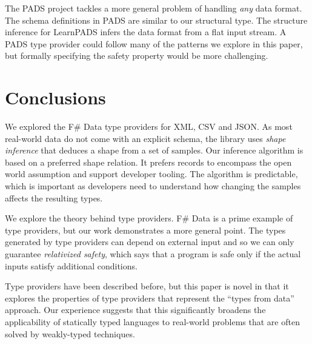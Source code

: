 \documentclass[10pt,preprint,blind,clearpagebib]{sigplanconf}
\begin{document}
The PADS project \cite{pads-dsl,pads-ml} tackles a more general problem of handling \emph{any} data format.
The schema definitions in PADS are similar to our structural type. The structure inference for LearnPADS
\cite{pads-learn} infers the data format from a flat input stream. A PADS type provider could follow
many of the patterns we explore in this paper, but formally specifying the safety property would be
more challenging.

\section{Conclusions}
\label{sec:conclusions}

We explored the F\# Data type providers for XML, CSV and JSON. As most real-world data do not come 
with an explicit schema, the library uses \emph{shape inference} that deduces a shape from a set of 
samples. Our inference algorithm is based on a preferred shape relation. It prefers records to 
encompass the open world assumption and support developer tooling. The algorithm is predictable, which is 
important as developers need to understand how changing the samples affects the resulting types.

We explore the theory behind type providers. F\# Data is a prime example of 
type providers, but our work demonstrates a more general point. The types generated by type 
providers can depend on external input and so we can only guarantee \emph{relativized safety}, 
which says that a program is safe only if the actual inputs satisfy additional conditions.

Type providers have been described before, but this paper is novel in that it explores the 
properties of type providers that represent the ``types from data'' approach. Our experience suggests 
that this significantly broadens the applicability of statically typed languages to real-world 
problems that are often solved by weakly-typed techniques.




\end{document}
